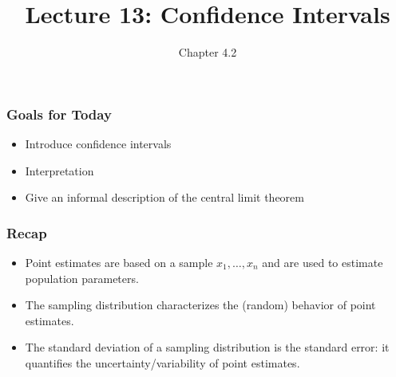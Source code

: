 \documentclass[handout]{beamer}
\title{Lecture 13: Confidence Intervals}
\author{Chapter 4.2}
\newcommand{\blue}[1]{\textcolor{blue2}{#1}}
\begin{document}
\begin{frame}
\titlepage
\end{frame}


\begin{frame}[fragile]
\frametitle{Goals for Today}

\begin{itemize}
\item Introduce confidence intervals
\item Interpretation
\item Give an informal description of the central limit theorem
\end{itemize}

\end{frame}


\begin{frame}[fragile]
\frametitle{Recap}

\begin{itemize}
\item \blue{Point estimates} are based on a sample $x_1, \ldots, x_n$ and are used to estimate population parameters.
\pause \item The \blue{sampling distribution} characterizes the (random) behavior of point estimates.  
\pause \item The standard deviation of a sampling distribution is the \blue{standard error}: it quantifies the uncertainty/variability of point estimates.  
\end{itemize}

\end{frame}
\end{document}
